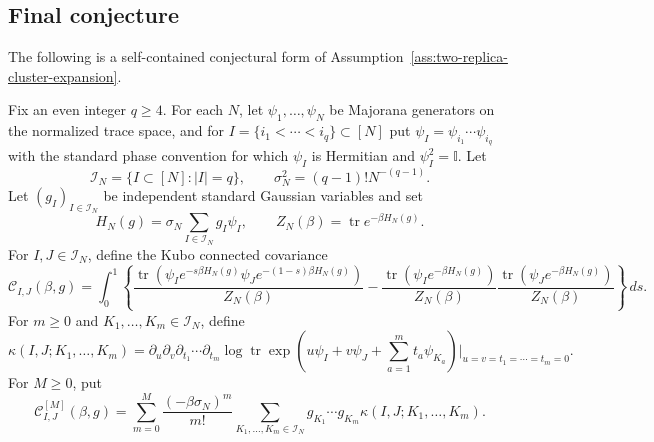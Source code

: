 \documentclass[11pt]{article}
\newcommand{\tr}{\operatorname{tr}}
\newcommand{\I}{\mathbb{I}}
\newcommand{\calI}{\mathcal{I}}
\newcommand{\dd}{\,d}
\begin{document}
\subsection{Final conjecture}

The following is a self-contained conjectural form of
Assumption~\ref{ass:two-replica-cluster-expansion}.

  Fix an even integer $q\geq4$.  For each $N$, let
  $\psi_1,\ldots,\psi_N$ be Majorana generators on the normalized trace space,
  and for $I=\{i_1<\cdots<i_q\}\subset[N]$ put
  $\psi_I=\psi_{i_1}\cdots\psi_{i_q}$ with the standard phase convention for
  which $\psi_I$ is Hermitian and $\psi_I^2=\I$.  Let
  \begin{equation}\label{eq:final-conj-index-set}
    \calI_N=\{I\subset[N]:|I|=q\},
    \qquad
    \sigma_N^2=(q-1)!N^{-(q-1)}.
  \end{equation}
  Let $(g_I)_{I\in\calI_N}$ be independent standard Gaussian variables and set
  \begin{equation}\label{eq:final-conj-hamiltonian}
    H_N(g)=\sigma_N\sum_{I\in\calI_N}g_I\psi_I,
    \qquad
    Z_N(\beta)=\tr e^{-\beta H_N(g)}.
  \end{equation}
  For $I,J\in\calI_N$, define the Kubo connected covariance
  \begin{equation}\label{eq:final-conj-kubo}
    \mathcal C_{I,J}(\beta,g)
    =
    \int_0^1
    \left\{
      \frac{
        \tr\left(\psi_I e^{-s\beta H_N(g)}
        \psi_J e^{-(1-s)\beta H_N(g)}\right)
      }{Z_N(\beta)}
      -
      \frac{\tr(\psi_Ie^{-\beta H_N(g)})}{Z_N(\beta)}
      \frac{\tr(\psi_Je^{-\beta H_N(g)})}{Z_N(\beta)}
    \right\}
    \dd s.
  \end{equation}
  For $m\geq0$ and $K_1,\ldots,K_m\in\calI_N$, define
  \begin{equation}\label{eq:final-conj-kappa}
    \kappa(I,J;K_1,\ldots,K_m)
    =
    \partial_u\partial_v\partial_{t_1}\cdots\partial_{t_m}
    \log\tr\exp\left(
      u\psi_I+v\psi_J+\sum_{a=1}^m t_a\psi_{K_a}
    \right)\bigg|_{u=v=t_1=\cdots=t_m=0}.
  \end{equation}
  For $M\geq0$, put
  \begin{equation}\label{eq:final-conj-truncation}
    \mathcal C^{[M]}_{I,J}(\beta,g)
    =
    \sum_{m=0}^M
    \frac{(-\beta\sigma_N)^m}{m!}
    \sum_{K_1,\ldots,K_m\in\calI_N}
    g_{K_1}\cdots g_{K_m}
    \kappa(I,J;K_1,\ldots,K_m).
  \end{equation}
\end{document}
